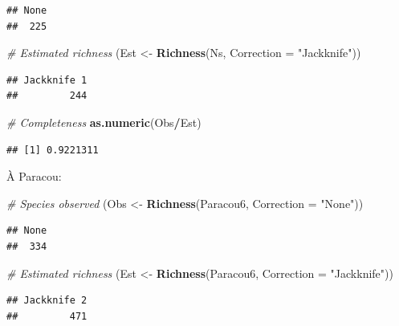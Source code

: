 \documentclass[
  11pt,
  french,
  a4paper,
  extrafontsizes,onecolumn,openright
  ]{memoir}
\newenvironment{Shaded}{\begin{snugshade}}{\end{snugshade}}
\newcommand{\CommentTok}[1]{\textcolor[rgb]{0.56,0.35,0.01}{\textit{#1}}}
\newcommand{\DataTypeTok}[1]{\textcolor[rgb]{0.13,0.29,0.53}{#1}}
\newcommand{\KeywordTok}[1]{\textcolor[rgb]{0.13,0.29,0.53}{\textbf{#1}}}
\newcommand{\NormalTok}[1]{#1}
\newcommand{\OperatorTok}[1]{\textcolor[rgb]{0.81,0.36,0.00}{\textbf{#1}}}
\newcommand{\StringTok}[1]{\textcolor[rgb]{0.31,0.60,0.02}{#1}}
\begin{document}
\begin{verbatim}
## None 
##  225
\end{verbatim}

\begin{Shaded}
\begin{Highlighting}[]
\CommentTok{# Estimated richness}
\NormalTok{(Est <-}\StringTok{ }\KeywordTok{Richness}\NormalTok{(Ns, }\DataTypeTok{Correction =} \StringTok{"Jackknife"}\NormalTok{))}
\end{Highlighting}
\end{Shaded}

\begin{verbatim}
## Jackknife 1 
##         244
\end{verbatim}

\begin{Shaded}
\begin{Highlighting}[]
\CommentTok{# Completeness}
\KeywordTok{as.numeric}\NormalTok{(Obs}\OperatorTok{/}\NormalTok{Est)}
\end{Highlighting}
\end{Shaded}

\begin{verbatim}
## [1] 0.9221311
\end{verbatim}

\normalsize

À Paracou:

\scriptsize

\begin{Shaded}
\begin{Highlighting}[]
\CommentTok{# Species observed}
\NormalTok{(Obs <-}\StringTok{ }\KeywordTok{Richness}\NormalTok{(Paracou6, }\DataTypeTok{Correction =} \StringTok{"None"}\NormalTok{))}
\end{Highlighting}
\end{Shaded}

\begin{verbatim}
## None 
##  334
\end{verbatim}

\begin{Shaded}
\begin{Highlighting}[]
\CommentTok{# Estimated richness}
\NormalTok{(Est <-}\StringTok{ }\KeywordTok{Richness}\NormalTok{(Paracou6, }\DataTypeTok{Correction =} \StringTok{"Jackknife"}\NormalTok{))}
\end{Highlighting}
\end{Shaded}

\begin{verbatim}
## Jackknife 2 
##         471
\end{verbatim}
\end{document}
